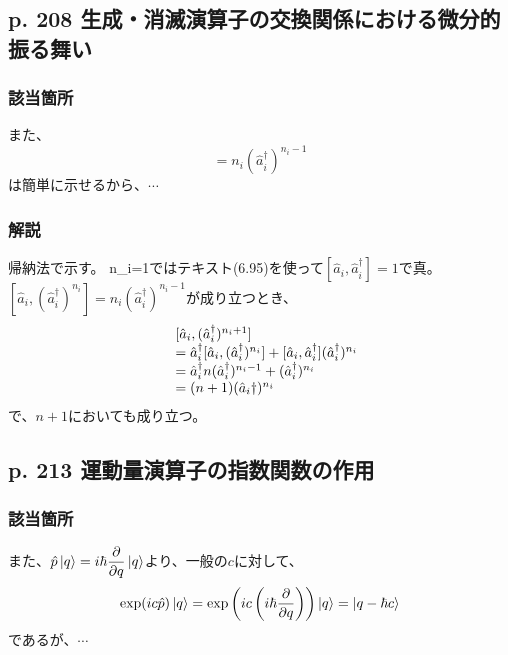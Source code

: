 \documentclass{jsarticle}
\begin{document}
\subsection*{p. 208 生成・消滅演算子の交換関係における微分的振る舞い}

\subsubsection*{該当箇所}

また、
\begin{equation*}
    [\hat{a}_i,(\hat{a}_i^\dagger)^{n_i}]=n_i(\hat{a}_i^\dagger)^{n_i-1}
\end{equation*}
は簡単に示せるから、$\cdots$

\subsubsection*{解説}
帰納法で示す。
n_i=1ではテキスト(6.95)を使って$[\hat{a}_i,\hat{a}_i^\dagger]=1$で真。
$[\hat{a}_i,(\hat{a}_i^\dagger)^{n_i}]=n_i(\hat{a}_i^\dagger)^{n_i-1}$が成り立つとき、
\begin{equation*}
    \begin{array}[]{cl}
        &
        [\hat{a}_i,(\hat{a}_i^\dagger)^{n_i+1}]
        \\
        &=
        \hat{a}_i^\dagger[\hat{a}_i,(\hat{a}_i^\dagger)^{n_i}]
        +
        [\hat{a}_i,\hat{a}_i^\dagger](\hat{a}_i^\dagger)^{n_i}
        \\
        &=
        \hat{a}_i^\dagger n(\hat{a}_i^\dagger)^{n_i-1}
        +
        (\hat{a}_i^\dagger)^{n_i}
        \\
        &=
        (n+1)(\hat{a}_i\dagger)^{n_i}
    \end{array}
\end{equation*}
で、$n+1$においても成り立つ。


\subsection*{p. 213 運動量演算子の指数関数の作用}

\subsubsection*{該当箇所}

また、$\hat{p}\ket{q}=i\hbar\dfrac{\partial}{\partial q}\ket{q}$より、一般の$c$に対して、
\begin{equation*}
    \exp(ic\hat{p})\ket{q}
    =
    \exp\left(
        ic\left(
            i\hbar\dfrac{\partial}{\partial q}
        \right)
    \right)
    \ket{q}
    =
    \ket{q-\hbar c}
\end{equation*}
であるが、$\cdots$
\end{document}
